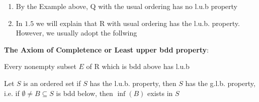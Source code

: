 \begin{rmk*}$ $
	\begin{enumerate}
		\item By the Example above, $\mathrm{Q}$ with the usual ordering has no l.u.b property
		\item In $1.5$ we will explain that $\mathrm{R}$ with usual ordering has the l.u.b. property.
		However, we usually adopt the follwing
	\end{enumerate}
\end{rmk*}



\textbf{The Axiom of Completence or Least upper bdd property}:

Every nonempty subset $E$ of $\mathrm{R}$ which is bdd above has l.u.b

\begin{thm*}[l.u.b.p. $\rightarrow$ g.l.b.p.]
	Let $S$ is an ordered set if $S$ has the l.u.b. property, then $S$ has the g.l.b. property, i.e. if $\emptyset \neq B \subseteq S$ is bdd below, then $\inf (B)$ exists in $S$ 
\end{thm*}

\newpage

